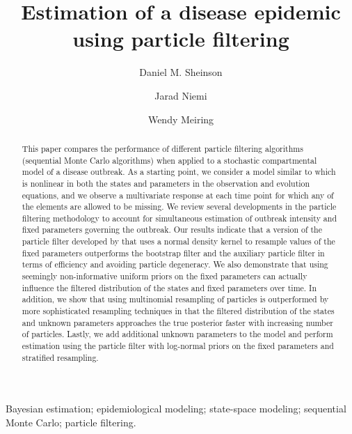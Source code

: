 \documentclass{elsarticle}
\begin{document}
\begin{frontmatter}

\title{Estimation of a disease epidemic using particle filtering}

\author[danny]{Daniel M. Sheinson}
\author[jarad]{Jarad Niemi}
\author[wendy]{Wendy Meiring}

\address[danny]{Corresponding author -- Department of Statistics and Applied Probability, University of Califonia--Santa Barbara, \\
 Santa Barbara, CA, U.S.A., sheinson@pstat.ucsb.edu, 1-847-609-7824}
 \address[jarad]{Department of Statistics, Iowa State University, Ames, IA, U.S.A., niemi@iastate.edu}
 \address[wendy]{Department of Statistics and Applied Probability, University of Califonia--Santa Barbara, \\
 Santa Barbara, CA, U.S.A., meiring@pstat.ucsb.edu}

\begin{abstract}
This paper compares the performance of different particle filtering algorithms (sequential Monte Carlo algorithms) when applied to a stochastic compartmental model of a disease outbreak. As a starting point, we consider a model similar to \citet{skvortsov2012monitoring} which is nonlinear in both the states and parameters in the observation and evolution equations, and we observe a multivariate response at each time point for which any of the elements are allowed to be missing. We review several developments in the particle filtering methodology to account for simultaneous estimation of outbreak intensity and fixed parameters governing the outbreak. Our results indicate that a version of the particle filter developed by \citet{Liu:West:comb:2001} that uses a normal density kernel to resample values of the fixed parameters outperforms the bootstrap filter and the auxiliary particle filter in terms of efficiency and avoiding particle degeneracy. We also demonstrate that using seemingly non-informative uniform priors on the fixed parameters can actually influence the filtered distribution of the states and fixed parameters over time. In addition, we show that using multinomial resampling of particles is outperformed by more sophisticated resampling techniques in that the filtered distribution of the states and unknown parameters approaches the true posterior faster with increasing number of particles. Lastly, we add additional unknown parameters to the model and perform estimation using the \citet{Liu:West:comb:2001} particle filter with log-normal priors on the fixed parameters and stratified resampling.
\end{abstract}

\begin{keyword}
Bayesian estimation; epidemiological modeling; state-space modeling; sequential Monte Carlo; particle filtering.
\end{keyword}

\end{frontmatter}
\end{document}
